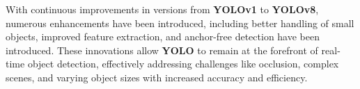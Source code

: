 %
With continuous improvements in versions from \textbf{YOLOv1} to \textbf{YOLOv8}, numerous enhancements have been introduced, including better handling of small objects, improved feature extraction, and anchor-free detection have been introduced. 
%
These innovations allow \textbf{YOLO} to remain at the forefront of real-time object detection, effectively addressing challenges like occlusion, complex scenes, and varying object sizes with increased accuracy and efficiency.
%
%
%